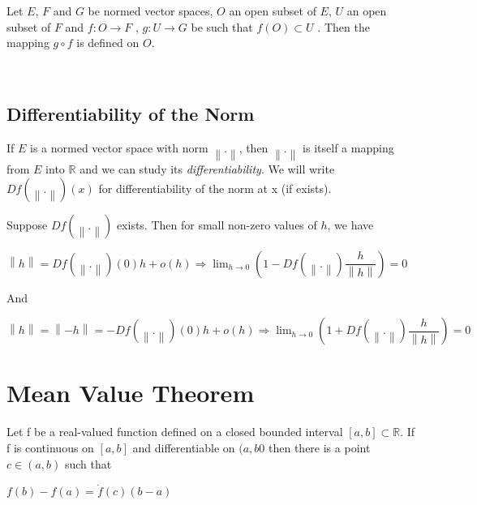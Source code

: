 \documentclass[12 pt]{article}
\theoremstyle{definition}
\theoremstyle{remark}
\newcommand{\R}{\mathbb{R}}
\newcommand\norm[1]{\left\lVert#1\right\rVert}
\begin{document}
Let $E$, $F$ and $G$ be normed vector spaces, $O$ an open subset of $E$, $U$ an open subset of $F$ and $f : O \rightarrow F$ , $g : U \rightarrow G$ be such that $f(O) \subset U$ . Then the mapping $g \circ f$ is defined on $O$.

\\


\normalfont

\subsection{Differentiability of the Norm}
If $E$ is a normed vector space with norm $\norm{.}$, then $\norm{.}$ is itself a mapping from $E$ into $\R$ and we can study its \textit{differentiability}. We will write $Df(\norm{.}) (x)$ for differentiability of the norm at x (if exists).

\proof Suppose $Df(\norm{.})$ exists. Then for small non-zero values of $h$, we have \\
\begin{center}
$ \norm{h} =  Df(\norm{.})(0)h + o(h) \Rightarrow \lim_{h \to 0} \left( 1 - Df(\norm{.}) \dfrac{h}{\norm{h}} \right) = 0 $
\end{center} And
\begin{center}
$ \norm{h} = \norm{-h} =  -Df(\norm{.})(0)h + o(h) \Rightarrow \lim_{h \to 0} \left( 1 + Df(\norm{.}) \dfrac{h}{\norm{h}} \right) = 0$
\end{center}


\newpage

\section{Mean Value Theorem}

\theorem Let f be a real-valued function defined on a closed bounded interval $[a,b] \subset \R$. If f is continuous on $[a,b] $ and differentiable on $(a,b0 $ then there is a point $c \in (a,b)$ such that
\begin{center}
$ f(b) - f(a) = \dot{f}(c)(b-a)$
\end{center}
\end{document}
